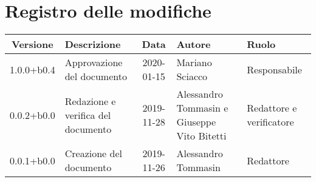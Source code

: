 \section*{Registro delle modifiche}

\begin{center}
	\begin{longtable}{|c|p{3.5cm}|c|p{3cm}|p{3cm}|}
		\hline
		\rowcolor{lighter-grayer}
		\textbf{Versione} & \textbf{Descrizione} & \textbf{Data} & \textbf{Autore} & \textbf{Ruolo} \\
		\hline
		\endfirsthead


	1.0.0+b0.4 & Approvazione del documento & 2020-01-15 & Mariano Sciacco & Responsabile \\
	\hline
	0.0.2+b0.0 & Redazione e verifica del documento & 2019-11-28 & Alessandro Tommasin e Giuseppe Vito Bitetti & Redattore e verificatore \\
	\hline
	0.0.1+b0.0 & Creazione del documento & 2019-11-26 & Alessandro Tommasin & Redattore \\
	\hline

	\end{longtable}
\end{center}
